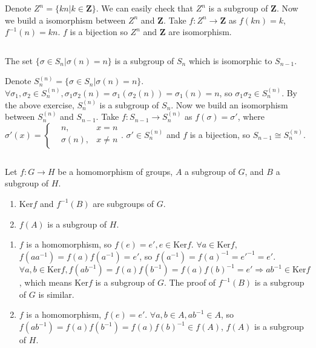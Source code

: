 \begin{answer}
    Denote $Z^{n}=\{kn|k\in\mathbf{Z}\}$. We can easily check that $Z^n$ is a subgroup of $\mathbf{Z}$. Now we build a isomorphism between $Z^{n}$ and $\mathbf{Z}$. Take $f:Z^{n}\to\mathbf{Z}$ as $f(kn)=k$, $f^{-1}(n)=kn$. $f$ is a bijection so $Z^{n}$ and $\mathbf{Z}$ are isomorphism.
\end{answer}

$$ $$

\begin{ex}
    The set $\{\sigma\in S_n | \sigma(n) = n\}$ is a subgroup of $S_n$ which is isomorphic to $S_{n-1}$.
\end{ex}

\begin{answer}
    Denote $S_n^{(n)}=\{\sigma\in S_n|\sigma(n)=n\}$. $\forall \sigma_1,\sigma_{2}\in S_n^{(n)}, \sigma_{1}\sigma_{2}(n)=\sigma_1(\sigma_{2}(n))=\sigma_{1}(n)=n$, so $\sigma_{1}\sigma_{2}\in S_n^{(n)}$. By the above exercise, $S_n^{(n)}$ is a subgroup of $S_n$. Now we build an isomorphism between $S_n^{(n)}$ and $S_{n-1}$.
    Take $f: S_{n-1}\to S_n^{(n)}$ as $f(\sigma) =\sigma'$, where $\sigma'(x)=\left\{\begin{aligned}
        &n, &x=n\\ &\sigma(n), &x\neq n
    \end{aligned}\right.$. $\sigma'\in S_n^{(n)}$ and $f$ is a bijection, so $S_{n-1}\cong S_n^{(n)}$.
\end{answer}

$$ $$

\begin{ex}
    Let $f: G\to H$ be a homomorphism of groups, $A$ a subgroup of $G$, and $B$ a subgroup of $H$.
    \begin{enumerate}
        \item $\mathrm{Ker} f$ and $f^{-1}(B)$ are subgroups of $G$.
        \item $f(A)$ is a subgroup of $H$.
    \end{enumerate}
\end{ex}

\begin{answer}
    \begin{enumerate}
        \item $f$ is a homomorphism, so $f(e)=e', e\in \mathrm{Ker} f$. $\forall a \in 
    \mathrm{Ker} f$, $f(aa^{-1})=f(a)f(a^{-1})=e'$, so $f(a^{-1})=f(a)^{-1}=e'^{-1}=e'$. $\forall a,b \in \mathrm{Ker} f, f(ab^{-1})=f(a)f(b^{-1})=f(a)f(b)^{-1}=e'\Rightarrow ab^{-1}\in \mathrm{Ker} f$, which means $\mathrm{Ker} f$ is a subgroup of $G$. The proof of $f^{-1}(B)$ is a subgroup of $G$ is similar.
        \item $f$ is a homomorphism, $f(e)=e'$. $\forall a,b\in A, ab^{-1}\in A$, so $f(ab^{-1})=f(a)f(b^{-1})=f(a)f(b)^{-1}\in f(A)$, $f(A)$ is a subgroup of $H$.
    \end{enumerate}
\end{answer}

